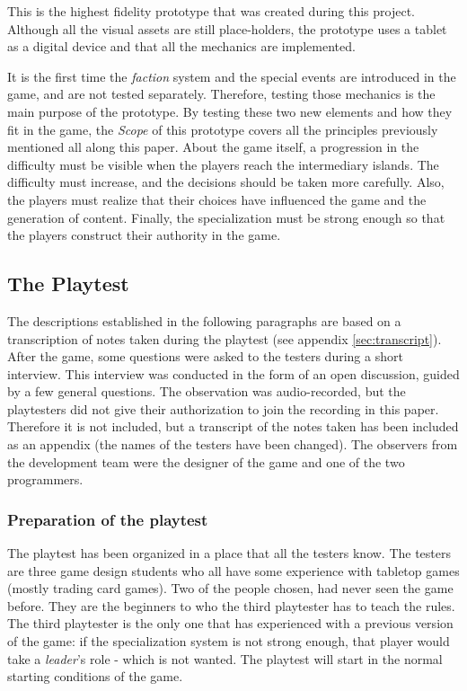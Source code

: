 This is the highest fidelity prototype that was created during this project. Although all the visual assets are still place-holders, the prototype uses a tablet as a digital device and that all the mechanics are implemented. 

It is the first time the \textit{faction} system and the special events are introduced in the game, and are not tested separately. Therefore, testing those mechanics is the main purpose of the prototype. By testing these two new elements and how they fit in the game, the \textit{Scope} of this prototype covers all the principles previously mentioned all along this paper. About the game itself, a progression in the difficulty must be visible when the players reach the intermediary islands. The difficulty must increase, and the decisions should be taken more carefully. Also, the players must realize that their choices have influenced the game and the generation of content. Finally, the specialization must be strong enough so that the players construct their authority in the game. 

\subsection{The Playtest}
The descriptions established in the following paragraphs are based on a transcription of notes taken during the playtest (see appendix \ref{sec:transcript}). After the game, some questions were asked to the testers during a short interview. This interview was conducted in the form of an open discussion, guided by a few general questions. The observation was audio-recorded, but the playtesters did not give their authorization to join the recording in this paper. Therefore it is not included, but a transcript of the notes taken has been included as an appendix (the names of the testers have been changed). The observers from the development team were the designer of the game and one of the two programmers.
\subsubsection{Preparation of the playtest}
The playtest has been organized in a place that all the testers know. The testers are three game design students who all have  some experience with tabletop games (mostly trading card games). Two of the people chosen, had never seen the game before. They are the beginners to who the third playtester has to teach the rules. The third playtester is the only one that has experienced with a previous version of the game: if the specialization system is not strong enough, that player would take a \textit{leader}'s role - which is not wanted. The playtest will start in the normal starting conditions of the game.

